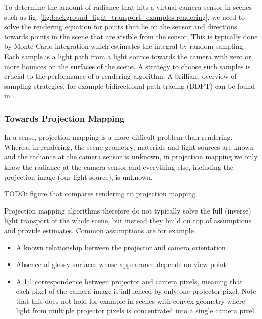 To determine the amount of radiance that hits a virtual camera sensor in scenes such as fig. \ref{fig:background_light_transport_examples-rendering}, we need to solve the rendering equation for points that lie on the sensor and directions towards points in the scene that are visible from the sensor. This is typically done by Monte Carlo integration which estimates the integral by random sampling. Each sample is a light path from a light source towards the camera with zero or more bounces on the surfaces of the scene. A strategy to choose such samples is crucial to the performance of a rendering algorithm. A brilliant overview of sampling strategies, for example bidirectional path tracing (BDPT) can be found in \citet{Veach1997}.

\subsubsection{Towards Projection Mapping}
\label{section:background-projection_mapping-light_transport-towards_projection_mapping}

In a sense, projection mapping is a more difficult problem than rendering. Whereas in rendering, the scene geometry, materials and light sources are known and the radiance at the camera sensor is unknown, in projection mapping we only know the radiance at the camera sensor and everything else, including the projection image (our light source), is unknown.

{\color{red} TODO: figure that compares rendering to projection mapping}

Projection mapping algorithms therefore do not typically solve the full (inverse) light transport of the whole scene, but instead they build on top of assumptions and provide estimates. Common assumptions are for example

\begin{itemize}
    \item A known relationship between the projector and camera orientation
    \item Absence of glossy surfaces whose appearance depends on view point
    \item A 1:1 correspondence between projector and camera pixels, meaning that each pixel of the camera image is influenced by only one projector pixel. Note that this does not hold for example in scenes with convex geometry where light from multiple projector pixels is concentrated into a single camera pixel
\end{itemize}

